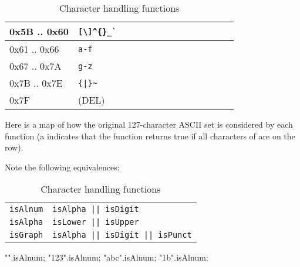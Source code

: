 \begin{urbiscriptapi}
\begin{table}[tp]
\begin{tabular}{|l||l||*{12}{c|}}
      0x5B .. 0x60 & \verb|[\]^{}_`|            &    &    &    &    &    &    &    &    &    & \X & \X & \X \\\hline
      0x61 .. 0x66 & \verb|a-f|                 &    &    &    &    & \X & \X &    & \X & \X &    & \X & \X \\\hline
      0x67 .. 0x7A & \verb|g-z|                 &    &    &    &    & \X & \X &    &    & \X &    & \X & \X \\\hline
      0x7B .. 0x7E & \verb-{|}~-                &    &    &    &    &    &    &    &    &    & \X & \X & \X \\\hline
      0x7F         & (DEL)                      & \X &    &    &    &    &    &    &    &    &    &    &    \\\hline
    \end{tabular}
    \begin{legend}
      Here is a map of how the original 127-character ASCII set is
      considered by each function (a \X{} indicates that the function
      returns true if all characters of \this are on the row).

      Note the following equivalences:

      \begin{tabular}{r@{~$\equiv$~}l}
        \lstinline'isAlnum'
        & \lstinline'isAlpha || isDigit'\\
        \lstinline'isAlpha'
        & \lstinline'isLower || isUpper'\\
        \lstinline'isGraph'
        & \lstinline'isAlpha || isDigit || isPunct'\\
      \end{tabular}
    \end{legend}
    \caption{Character handling functions}
    \label{tab:string:ischar}
  \end{table}
\begin{urbiassert}
           "".isAlnum;
        "123".isAlnum;
        "abc".isAlnum; "1b".isAlnum;
\end{urbiassert}



\end{urbiscriptapi}
